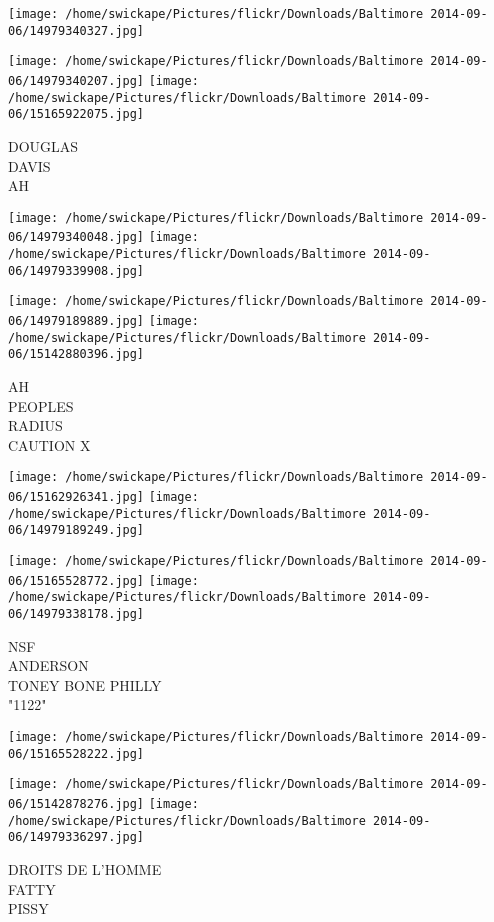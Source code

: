 \documentclass[10pt,letterpaper]{article}
\begin{document}
\texttt{[image: /home/swickape/Pictures/flickr/Downloads/Baltimore 2014-09-06/14979340327.jpg]}

\vspace{0.25in}
\texttt{[image: /home/swickape/Pictures/flickr/Downloads/Baltimore 2014-09-06/14979340207.jpg]}
\texttt{[image: /home/swickape/Pictures/flickr/Downloads/Baltimore 2014-09-06/15165922075.jpg]}

DOUGLAS\\
DAVIS\\
AH
\pagebreak

\texttt{[image: /home/swickape/Pictures/flickr/Downloads/Baltimore 2014-09-06/14979340048.jpg]}
\texttt{[image: /home/swickape/Pictures/flickr/Downloads/Baltimore 2014-09-06/14979339908.jpg]}

\texttt{[image: /home/swickape/Pictures/flickr/Downloads/Baltimore 2014-09-06/14979189889.jpg]}
\texttt{[image: /home/swickape/Pictures/flickr/Downloads/Baltimore 2014-09-06/15142880396.jpg]}

AH\\
PEOPLES\\
RADIUS\\
CAUTION X
\pagebreak

\texttt{[image: /home/swickape/Pictures/flickr/Downloads/Baltimore 2014-09-06/15162926341.jpg]}
\texttt{[image: /home/swickape/Pictures/flickr/Downloads/Baltimore 2014-09-06/14979189249.jpg]}

\texttt{[image: /home/swickape/Pictures/flickr/Downloads/Baltimore 2014-09-06/15165528772.jpg]}
\texttt{[image: /home/swickape/Pictures/flickr/Downloads/Baltimore 2014-09-06/14979338178.jpg]}

NSF\\
ANDERSON\\
TONEY BONE PHILLY\\
"1122"
\pagebreak

\texttt{[image: /home/swickape/Pictures/flickr/Downloads/Baltimore 2014-09-06/15165528222.jpg]}

\vspace{0.25in}
\texttt{[image: /home/swickape/Pictures/flickr/Downloads/Baltimore 2014-09-06/15142878276.jpg]}
\texttt{[image: /home/swickape/Pictures/flickr/Downloads/Baltimore 2014-09-06/14979336297.jpg]}

DROITS DE L'HOMME\\
FATTY\\
PISSY
\pagebreak
\end{document}
